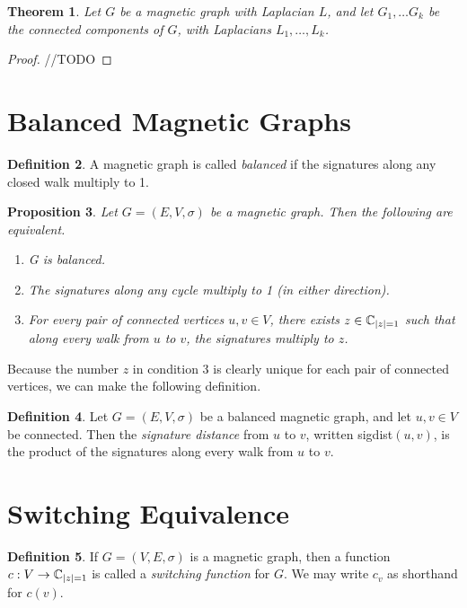 \documentclass[12pt]{article}
\newtheorem{thm}{Theorem}
\newtheorem{prop}[thm]{Proposition}
\theoremstyle{definition}
\newtheorem{defn}[thm]{Definition}
\newcommand{\C}{\mathbb C}
\DeclarePairedDelimiter\abs{\lvert}{\rvert}%
\begin{document}
\begin{thm}\label{spectrum is sum of spectra of connected components}
Let $G$ be a magnetic graph with Laplacian $L$, and let $G_1, \dots G_k$ be the connected components of $G$, with Laplacians $L_1, \dots, L_k$. 
\end{thm}
\begin{proof}
//TODO
\end{proof}

\section{Balanced Magnetic Graphs}

\begin{defn}
A magnetic graph is called \textit{balanced} if the signatures along any closed walk multiply to 1.
\end{defn}

\begin{prop}\label{equivalent conditions for balancedness}
Let $G=(E, V, \sigma)$ be a magnetic graph. Then the following are equivalent.
\begin{enumerate}
\item G is balanced.
\item The signatures along any cycle multiply to 1 (in either direction).
\item For every pair of connected vertices $u, v \in V$, there exists $z \in \C_{\abs*{z}=1}$ such that along every walk from $u$ to $v$, the signatures multiply to $z$. 
\end{enumerate}
\end{prop}

Because the number $z$ in condition 3 is clearly unique for each pair of connected vertices, we can make the following definition.

\begin{defn}
Let $G=(E,V, \sigma)$ be a balanced magnetic graph, and let $u, v \in V$ be connected. Then the \textit{signature distance} from $u$ to $v$, written sigdist$(u, v)$, is the product of the signatures along every walk from $u$ to $v$.
\end{defn}

\section{Switching Equivalence}

\begin{defn}
If $G=(V, E, \sigma)$ is a magnetic graph, then a function $c: V \rightarrow \C_{\abs*{z}=1}$ is called a \textit{switching function} for $G$. We may write $c_v$ as shorthand for $c(v)$.
\end{defn}
\end{document}
